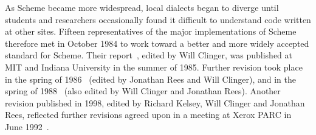 \vest As Scheme became more widespread,
local dialects began to diverge until students and researchers
occasionally found it difficult to understand code written at other
sites.
Fifteen representatives of the major implementations of Scheme therefore
met in October 1984 to work toward a better and more widely accepted
standard for Scheme.
%
Their report~\cite{RRRS}, edited by Will Clinger,
was published at MIT and Indiana University in the summer of 1985.
Further revision took place in the spring of 1986~\cite{R3RS} (edited
by Jonathan Rees and Will Clinger),
and in the spring of 1988~\cite{R4RS} (also edited by Will Clinger and
Jonathan Rees).  Another revision published in 1998, edited
by Richard Kelsey, Will Clinger and Jonathan Rees,
reflected further revisions agreed upon in a meeting at Xerox PARC in
June 1992~\cite{R5RS}.


